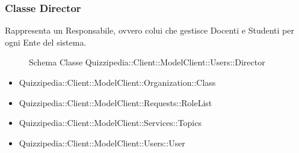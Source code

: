 \subsubsection{Classe Director}
Rappresenta un Responsabile, ovvero colui che gestisce Docenti e Studenti per ogni Ente del sistema.
\begin{figure}[H]
\centering
\noindent{}
\caption[Schema Classe Director]{Schema Classe Quizzipedia::Client::ModelClient::Users::Director}
\end{figure}
\begin{itemize}
\item Quizzipedia::Client::ModelClient::Organization::Class
\item Quizzipedia::Client::ModelClient::Requests::RoleList
\item Quizzipedia::Client::ModelClient::Services::Topics
\item Quizzipedia::Client::ModelClient::Users::User
\end{itemize}
